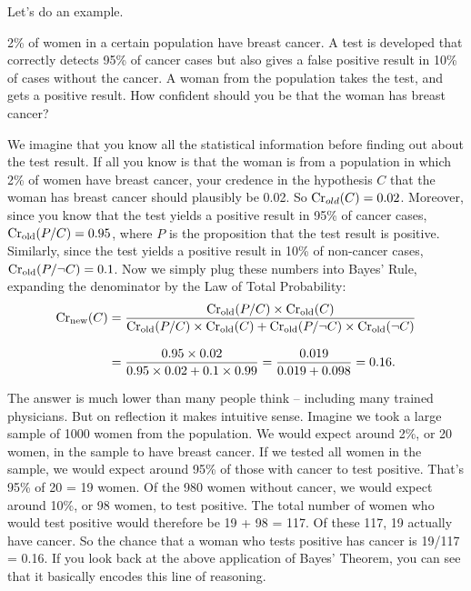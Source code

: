 Let's do an example.
\begin{example}\label{ex:base}
  2\% of women in a certain population have breast cancer. A test is
  developed that correctly detects 95\% of cancer cases but also gives
  a false positive result in 10\% of cases without the cancer. A woman
  from the population takes the test, and gets a positive result. How
  confident should you be that the woman has breast cancer?
\end{example}

We imagine that you know all the statistical information before
finding out about the test result. If all you know is that the woman
is from a population in which 2\% of women have breast cancer, your
credence in the hypothesis $C$ that the woman has breast cancer should
plausibly be 0.02. So $\text{Cr}_{old}(C) = 0.02$. Moreover, since you know
that the test yields a positive result in 95\% of cancer cases,
$\text{Cr}_{\text{old}}(P/C) = 0.95$, where $P$ is the proposition that the
test result is positive. Similarly, since the test yields a positive
result in 10\% of non-cancer cases, $\text{Cr}_{\text{old}}(P/\neg C) =
0.1$. Now we simply plug these numbers into Bayes' Rule, expanding the
denominator by the Law of Total Probability:
%
\begin{align*}
  \text{Cr}_{\text{new}}(C) &= \frac{\text{Cr}_{\text{old}}(P/C) \times
  \text{Cr}_{\text{old}}(C)}{\text{Cr}_\text{old}(P/C) \times \text{Cr}_\text{old}(C) +
  \text{Cr}_\text{old}(P/\neg C)\times \text{Cr}_\text{old}(\neg C)}\\[3mm]
  &= \frac{0.95 \times 0.02}{0.95 \times 0.02 + 0.1 \times 0.99} = \frac{0.019}{0.019 + 0.098} = 0.16.
\end{align*}

The answer is much lower than many people think -- including many trained 
physicians. But on reflection it makes intuitive sense. Imagine we
took a large sample of 1000 women from the population. We would expect
around 2\%, or 20 women, in the sample to have breast cancer. If we
tested all women in the sample, we would expect around 95\% of those
with cancer to test positive. That's 95\% of 20 = 19 women. Of the 980
women without cancer, we would expect around 10\%, or 98 women, to
test positive. The total number of women who would test positive would
therefore be 19 + 98 = 117. Of these 117, 19 actually have cancer. So the
chance that a woman who tests positive has cancer is 19/117 = 0.16. If
you look back at the above application of Bayes' Theorem, you can see
that it basically encodes this line of reasoning.

